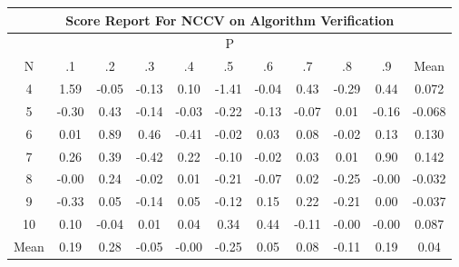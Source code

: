 \documentclass[11pt,a4paper]{report}
\begin{document}
\begin{longtable}{ | c || c | c | c | c | c | c | c | c | c || c |}
\hline
\multicolumn{11}{|c|}{ Score Report For NCCV on Algorithm Verification} \\
\hline
\multicolumn{11}{|c|}{ P } \\
\hline
N & .1 & .2 & .3 & .4 & .5 & .6 & .7 & .8 & .9 & Mean\\
 \hline
 \hline
 \endhead
  4 &  \cellcolor[HTML]{D7D7FF} 1.59 &  \cellcolor[HTML]{FFFFFF} -0.05 &  \cellcolor[HTML]{FFFFFF} -0.13 &  \cellcolor[HTML]{FFFFFF} 0.10 &  \cellcolor[HTML]{FFDFDF} -1.41 &  \cellcolor[HTML]{FFFFFF} -0.04 &  \cellcolor[HTML]{F7F7FF} 0.43 &  \cellcolor[HTML]{FFF7F7} -0.29 &  \cellcolor[HTML]{F7F7FF} 0.44 & 0.072 \\
  5 &  \cellcolor[HTML]{FFF7F7} -0.30 &  \cellcolor[HTML]{F7F7FF} 0.43 &  \cellcolor[HTML]{FFFFFF} -0.14 &  \cellcolor[HTML]{FFFFFF} -0.03 &  \cellcolor[HTML]{FFF7F7} -0.22 &  \cellcolor[HTML]{FFFFFF} -0.13 &  \cellcolor[HTML]{FFFFFF} -0.07 &  \cellcolor[HTML]{FFFFFF} 0.01 &  \cellcolor[HTML]{FFF7F7} -0.16 & -0.068 \\
  6 &  \cellcolor[HTML]{FFFFFF} 0.01 &  \cellcolor[HTML]{E7E7FF} 0.89 &  \cellcolor[HTML]{F7F7FF} 0.46 &  \cellcolor[HTML]{FFF7F7} -0.41 &  \cellcolor[HTML]{FFFFFF} -0.02 &  \cellcolor[HTML]{FFFFFF} 0.03 &  \cellcolor[HTML]{FFFFFF} 0.08 &  \cellcolor[HTML]{FFFFFF} -0.02 &  \cellcolor[HTML]{FFFFFF} 0.13 & 0.130 \\
  7 &  \cellcolor[HTML]{F7F7FF} 0.26 &  \cellcolor[HTML]{F7F7FF} 0.39 &  \cellcolor[HTML]{FFF7F7} -0.42 &  \cellcolor[HTML]{F7F7FF} 0.22 &  \cellcolor[HTML]{FFFFFF} -0.10 &  \cellcolor[HTML]{FFFFFF} -0.02 &  \cellcolor[HTML]{FFFFFF} 0.03 &  \cellcolor[HTML]{FFFFFF} 0.01 &  \cellcolor[HTML]{E7E7FF} 0.90 & 0.142 \\
  8 &  \cellcolor[HTML]{FFFFFF} -0.00 &  \cellcolor[HTML]{F7F7FF} 0.24 &  \cellcolor[HTML]{FFFFFF} -0.02 &  \cellcolor[HTML]{FFFFFF} 0.01 &  \cellcolor[HTML]{FFF7F7} -0.21 &  \cellcolor[HTML]{FFFFFF} -0.07 &  \cellcolor[HTML]{FFFFFF} 0.02 &  \cellcolor[HTML]{FFF7F7} -0.25 &  \cellcolor[HTML]{FFFFFF} -0.00 & -0.032 \\
  9 &  \cellcolor[HTML]{FFF7F7} -0.33 &  \cellcolor[HTML]{FFFFFF} 0.05 &  \cellcolor[HTML]{FFFFFF} -0.14 &  \cellcolor[HTML]{FFFFFF} 0.05 &  \cellcolor[HTML]{FFFFFF} -0.12 &  \cellcolor[HTML]{FFFFFF} 0.15 &  \cellcolor[HTML]{F7F7FF} 0.22 &  \cellcolor[HTML]{FFF7F7} -0.21 &  \cellcolor[HTML]{FFFFFF} 0.00 & -0.037 \\
  10 &  \cellcolor[HTML]{FFFFFF} 0.10 &  \cellcolor[HTML]{FFFFFF} -0.04 &  \cellcolor[HTML]{FFFFFF} 0.01 &  \cellcolor[HTML]{FFFFFF} 0.04 &  \cellcolor[HTML]{F7F7FF} 0.34 &  \cellcolor[HTML]{F7F7FF} 0.44 &  \cellcolor[HTML]{FFFFFF} -0.11 &  \cellcolor[HTML]{FFFFFF} -0.00 &  \cellcolor[HTML]{FFFFFF} -0.00 & 0.087 \\
 \hline
 \hline
Mean &  \cellcolor[HTML]{F7F7FF} 0.19 &  \cellcolor[HTML]{F7F7FF} 0.28 &  \cellcolor[HTML]{FFFFFF} -0.05 &  \cellcolor[HTML]{FFFFFF} -0.00 &  \cellcolor[HTML]{FFF7F7} -0.25 &  \cellcolor[HTML]{FFFFFF} 0.05 &  \cellcolor[HTML]{FFFFFF} 0.08 &  \cellcolor[HTML]{FFFFFF} -0.11 &  \cellcolor[HTML]{F7F7FF} 0.19 &  \cellcolor[HTML]{FFFFFF} 0.04
\end{longtable}
\end{document}
